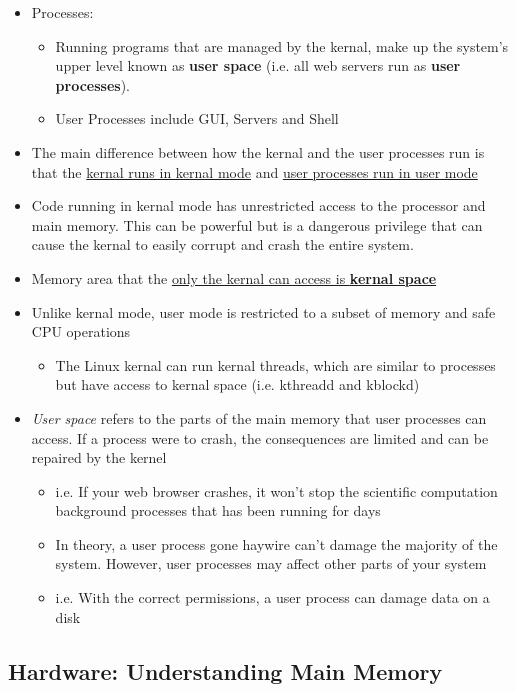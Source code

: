 \documentclass{article}
\begin{document}
\begin{itemize}
\begin{itemize}
			\item Processes:
				\begin{itemize}
					\item Running programs that are managed by the kernal, make up the system's upper level known as {\bf user space} (i.e. all web servers run as {\bf user processes}).
					\item User Processes include GUI, Servers and Shell
				\end{itemize}
			
			\item The main difference between how the kernal and the user processes run is that the \underline{kernal runs in kernal mode} and \underline{user processes run in user mode}
			
			\item Code running in kernal mode has unrestricted access to the processor and main memory. This can be powerful but is a dangerous privilege that can cause the kernal to easily corrupt and crash the entire system. 
			
			\item Memory area that the \underline{only the kernal can access is {\bf kernal space}}
			
			\item Unlike kernal mode, user mode is restricted to a subset of memory and safe CPU operations
			
			\begin{itemize}
				\item The Linux kernal can run kernal threads, which are similar to processes but have access to kernal space (i.e. kthreadd and kblockd)
			\end{itemize}
			
			\item \textit{User space} refers to the parts of the main memory that user processes can access. If a process were to crash, the consequences are limited and can be repaired by the kernel
			
				\begin{itemize}
					\item i.e. If your web browser crashes, it won't stop the scientific computation background processes that has been running for days
					\item In theory, a user process gone haywire can't damage the majority of the system. However, user processes may affect other parts of your system
					\item i.e. With the correct permissions, a user process can damage data on a disk
				\end{itemize}
				
		\end{itemize}
	\end{itemize}

	\subsection{Hardware: Understanding Main Memory}
	
\end{document}
